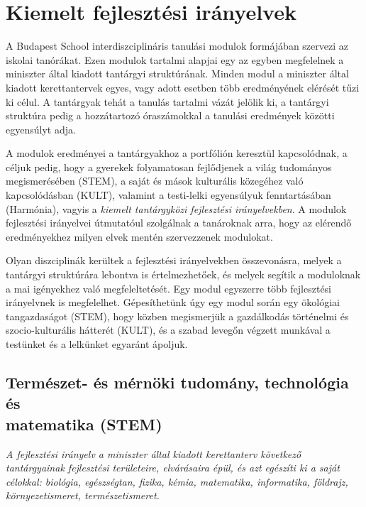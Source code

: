 \section{Kiemelt fejlesztési irányelvek}
\label{sec:kiemelt_fejlesztesi_iranyelvek}
A Budapest School interdiszciplináris tanulási modulok formájában szervezi az iskolai tanórákat. Ezen modulok tartalmi alapjai egy az egyben megfelelnek a miniszter által kiadott tantárgyi struktúrának. Minden modul a miniszter által kiadott kerettantervek egyes, vagy adott esetben több eredményének elérését tűzi ki célul. A tantárgyak tehát a tanulás tartalmi vázát jelölik ki, a tantárgyi struktúra pedig a hozzátartozó óraszámokkal a tanulási eredmények közötti egyensúlyt adja. 

A modulok eredményei a tantárgyakhoz a portfólión keresztül kapcsolódnak, a céljuk pedig, hogy a gyerekek folyamatosan fejlődjenek a világ tudományos megismerésében (STEM), a saját és mások kulturális közegéhez való kapcsolódásban (KULT), valamint a testi-lelki egyensúlyuk fenntartásában (Harmónia), vagyis a \emph{kiemelt tantárgyközi fejlesztési irányelvekben}. A modulok fejlesztési irányelvei útmutatóul szolgálnak a tanároknak arra, hogy az elérendő eredményekhez milyen elvek mentén szervezzenek modulokat. 

Olyan diszciplinák kerültek a fejlesztési irányelvekben összevonásra, melyek a tantárgyi struktúrára lebontva is értelmezhetőek, és melyek segítik a moduloknak a mai igényekhez való megfeleltetését. Egy modul egyszerre több fejlesztési irányelvnek is megfelelhet. Gépesíthetünk úgy egy modul során egy ökológiai tangazdaságot (STEM), hogy közben megismerjük a gazdálkodás történelmi és szocio-kulturális hátterét (KULT), és a szabad levegőn végzett munkával a testünket és a lelkünket egyaránt ápoljuk.   


\subsection[STEM]{Természet- és mérnöki	tudomány, technológia és\\
  matematika
  (STEM)}%
\emph{A fejlesztési irányelv a miniszter által kiadott kerettanterv következő tantárgyainak fejlesztési területeire, elvárásaira épül, és azt egészíti ki a saját célokkal: biológia, egészségtan, fizika, kémia, matematika, informatika, földrajz, környezetismeret, természetismeret.}

